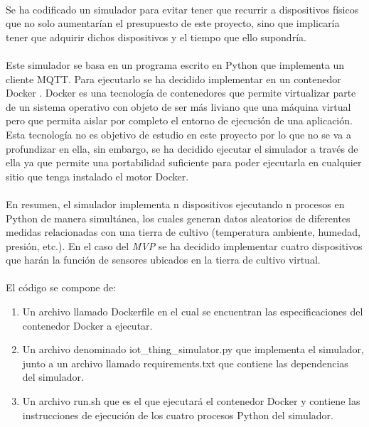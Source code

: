 \documentclass[../../memoria.tex]{subfiles}
\begin{document}
\paragraph{}
Se ha codificado un simulador para evitar tener que recurrir a dispositivos físicos que no solo aumentarían el presupuesto de este proyecto, sino que implicaría tener que adquirir dichos dispositivos y el tiempo que ello supondría.

\paragraph{}
Este simulador se basa en un programa escrito en Python que implementa un cliente MQTT. Para ejecutarlo se ha decidido implementar en un contenedor Docker \cite{docker}. Docker es una tecnología de contenedores que permite virtualizar parte de un sistema operativo con objeto de ser más liviano que una máquina virtual pero que permita aislar por completo el entorno de ejecución de una aplicación. Esta tecnología no es objetivo de estudio en este proyecto por lo que no se va a profundizar en ella, sin embargo, se ha decidido ejecutar el simulador a través de ella ya que permite una portabilidad suficiente para poder ejecutarla en cualquier sitio que tenga instalado el motor Docker.

\paragraph{}
En resumen, el simulador implementa n dispositivos ejecutando n procesos en Python de manera simultánea, los cuales generan datos aleatorios de diferentes medidas relacionadas con una tierra de cultivo (temperatura ambiente, humedad, presión, etc.). En el caso del \textit{MVP} se ha decidido implementar cuatro dispositivos que harán la función de sensores ubicados en la tierra de cultivo virtual.

\paragraph{}
El código se compone de:

\begin{enumerate}
    \item Un archivo llamado Dockerfile en el cual se encuentran las especificaciones del contenedor Docker a ejecutar.

    \item Un archivo denominado iot\_thing\_simulator.py que implementa el simulador, junto a un archivo llamado requirements.txt que contiene las dependencias del simulador.

    \item Un archivo run.sh que es el que ejecutará el contenedor Docker y contiene las instrucciones de ejecución de los cuatro procesos Python del simulador.
\end{enumerate}
\end{document}
